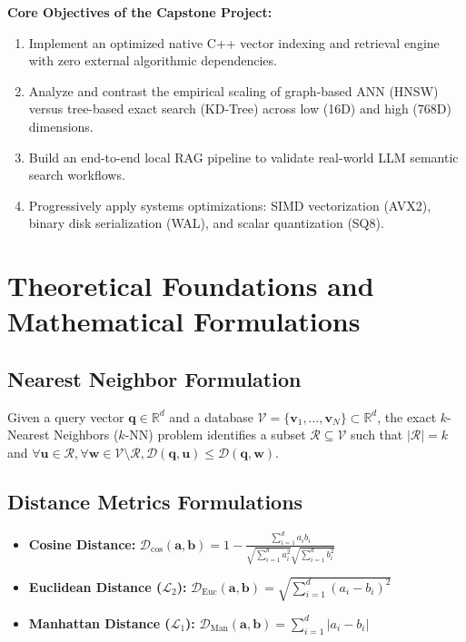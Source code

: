\documentclass[11pt,a4paper]{article}
\begin{document}
\textbf{Core Objectives of the Capstone Project:}
\begin{enumerate}[noitemsep,topsep=2pt]
    \item Implement an optimized native C++ vector indexing and retrieval engine with zero external algorithmic dependencies.
    \item Analyze and contrast the empirical scaling of graph-based ANN (HNSW) versus tree-based exact search (KD-Tree) across low (16D) and high (768D) dimensions.
    \item Build an end-to-end local RAG pipeline to validate real-world LLM semantic search workflows.
    \item Progressively apply systems optimizations: SIMD vectorization (AVX2), binary disk serialization (WAL), and scalar quantization (SQ8).
\end{enumerate}

\section{Theoretical Foundations and Mathematical Formulations}
\subsection{Nearest Neighbor Formulation}
Given a query vector $\mathbf{q} \in \mathbb{R}^d$ and a database $\mathcal{V} = \{\mathbf{v}_1, \dots, \mathbf{v}_N\} \subset \mathbb{R}^d$, the exact $k$-Nearest Neighbors ($k$-NN) problem identifies a subset $\mathcal{R} \subseteq \mathcal{V}$ such that $|\mathcal{R}| = k$ and $\forall \mathbf{u} \in \mathcal{R}, \forall \mathbf{w} \in \mathcal{V} \setminus \mathcal{R}, \mathcal{D}(\mathbf{q}, \mathbf{u}) \le \mathcal{D}(\mathbf{q}, \mathbf{w})$.

\subsection{Distance Metrics Formulations}
\begin{itemize}[noitemsep,topsep=2pt]
    \item \textbf{Cosine Distance:} $\mathcal{D}_{\text{cos}}(\mathbf{a}, \mathbf{b}) = 1 - \frac{\sum_{i=1}^d a_i b_i}{\sqrt{\sum_{i=1}^d a_i^2} \sqrt{\sum_{i=1}^d b_i^2}}$
    \item \textbf{Euclidean Distance ($\mathcal{L}_2$):} $\mathcal{D}_{\text{Euc}}(\mathbf{a}, \mathbf{b}) = \sqrt{\sum_{i=1}^d (a_i - b_i)^2}$
    \item \textbf{Manhattan Distance ($\mathcal{L}_1$):} $\mathcal{D}_{\text{Man}}(\mathbf{a}, \mathbf{b}) = \sum_{i=1}^d |a_i - b_i|$
\end{itemize}
\end{document}
